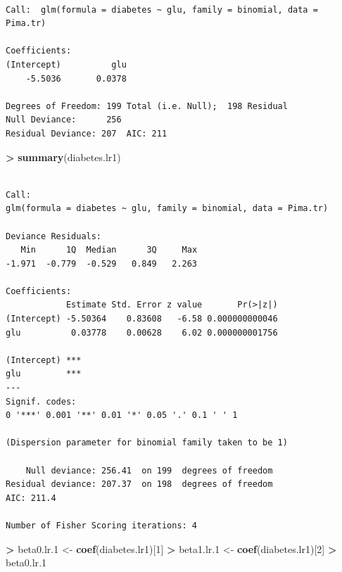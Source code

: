 \documentclass[]{krantz}
\makeatletter
\newenvironment{Shaded}{\begin{snugshade}}{\end{snugshade}}
\newcommand{\DecValTok}[1]{\textcolor[rgb]{0.06,0.06,0.06}{#1}}
\newcommand{\FloatTok}[1]{\textcolor[rgb]{0.06,0.06,0.06}{#1}}
\newcommand{\KeywordTok}[1]{\textcolor[rgb]{0.27,0.27,0.27}{\textbf{#1}}}
\newcommand{\NormalTok}[1]{#1}
\newcommand{\OperatorTok}[1]{\textcolor[rgb]{0.43,0.43,0.43}{\textbf{#1}}}
\newcommand{\StringTok}[1]{\textcolor[rgb]{0.5,0.5,0.5}{#1}}
\newenvironment{kframe}{%
\medskip{}
\setlength{\fboxsep}{.8em}
 \def\at@end@of@kframe{}%
 \ifinner\ifhmode%
  \def\at@end@of@kframe{\end{minipage}}%
  \begin{minipage}{\columnwidth}%
 \fi\fi%
 \def\FrameCommand##1{\hskip\@totalleftmargin \hskip-\fboxsep
 \colorbox{shadecolor}{##1}\hskip-\fboxsep
     \hskip-\linewidth \hskip-\@totalleftmargin \hskip\columnwidth}%
 \MakeFramed {\advance\hsize-\width
   \@totalleftmargin\z@ \linewidth\hsize
   \@setminipage}}%
 {\par\unskip\endMakeFramed%
 \at@end@of@kframe}
\renewenvironment{Shaded}{\begin{kframe}}{\end{kframe}}
\makeatother
\begin{document}
\begin{verbatim}

Call:  glm(formula = diabetes ~ glu, family = binomial, data = Pima.tr)

Coefficients:
(Intercept)          glu  
    -5.5036       0.0378  

Degrees of Freedom: 199 Total (i.e. Null);  198 Residual
Null Deviance:      256 
Residual Deviance: 207  AIC: 211
\end{verbatim}

\begin{Shaded}
\begin{Highlighting}[]
\OperatorTok{>}\StringTok{ }\KeywordTok{summary}\NormalTok{(diabetes.lr1)}
\end{Highlighting}
\end{Shaded}

\begin{verbatim}

Call:
glm(formula = diabetes ~ glu, family = binomial, data = Pima.tr)

Deviance Residuals: 
   Min      1Q  Median      3Q     Max  
-1.971  -0.779  -0.529   0.849   2.263  

Coefficients:
            Estimate Std. Error z value       Pr(>|z|)
(Intercept) -5.50364    0.83608   -6.58 0.000000000046
glu          0.03778    0.00628    6.02 0.000000001756
               
(Intercept) ***
glu         ***
---
Signif. codes:  
0 '***' 0.001 '**' 0.01 '*' 0.05 '.' 0.1 ' ' 1

(Dispersion parameter for binomial family taken to be 1)

    Null deviance: 256.41  on 199  degrees of freedom
Residual deviance: 207.37  on 198  degrees of freedom
AIC: 211.4

Number of Fisher Scoring iterations: 4
\end{verbatim}

\begin{Shaded}
\begin{Highlighting}[]
\OperatorTok{>}\StringTok{ }\NormalTok{beta0.lr}\FloatTok{.1}\NormalTok{ <-}\StringTok{ }\KeywordTok{coef}\NormalTok{(diabetes.lr1)[}\DecValTok{1}\NormalTok{]}
\OperatorTok{>}\StringTok{ }\NormalTok{beta1.lr}\FloatTok{.1}\NormalTok{ <-}\StringTok{ }\KeywordTok{coef}\NormalTok{(diabetes.lr1)[}\DecValTok{2}\NormalTok{]}
\OperatorTok{>}\StringTok{ }\NormalTok{beta0.lr}\FloatTok{.1}
\end{Highlighting}
\end{Shaded}
\end{document}
